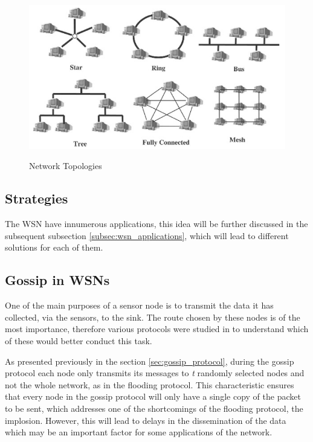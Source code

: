 \begin{figure}[h]
    \caption{Network Topologies \cite{Lewis2004}}
    \centering
    \includegraphics[scale=0.7]{Chapters/Figures/network_topologies.png}
    \label{fig:network_topologies}
\end{figure}

\subsection{Strategies}
\label{subsec:wsn_strategies}
The WSN have innumerous applications, this idea will be further discussed in the subsequent
subsection \ref{subsec:wsn_applications}, which will lead to different solutions for each of
them.

\subsection{Gossip in WSNs}
\label{subsec:gossip_in_wsns}
One of the main purposes of a sensor node is to transmit the data it has collected, via
the sensors, to the sink. The route chosen by these nodes is of the most importance,
therefore various protocols were studied in \cite{Akkaya2005} to understand which of
these would better conduct this task.

As presented previously in the section \ref{sec:gossip_protocol}, during the gossip protocol
each node only transmits its messages to \textit{t} randomly selected nodes and not the
whole network, as in the flooding protocol. This characteristic ensures that every node
in the gossip protocol will only have a single copy of the packet to be sent, which
addresses one of the shortcomings of the flooding protocol, the implosion. However, this
will lead to delays in the dissemination of the data which may be an important factor
for some applications of the network.

